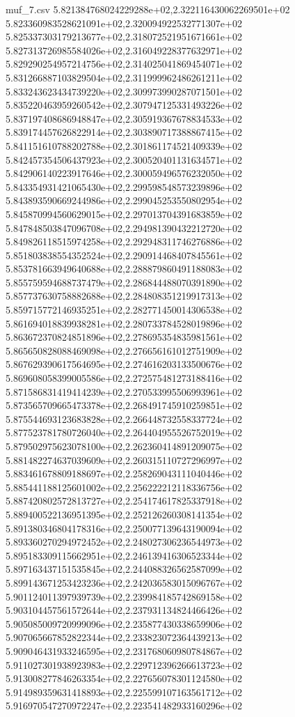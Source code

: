 \begin{filecontents*}{muf_7.csv}
5.821384768024229288e+02,2.322116430062269501e+02
5.823360983528621091e+02,2.320094922532771307e+02
5.825337303179213677e+02,2.318072521951671661e+02
5.827313726985584026e+02,2.316049228377632971e+02
5.829290254957214756e+02,2.314025041869454071e+02
5.831266887103829504e+02,2.311999962486261211e+02
5.833243623434739220e+02,2.309973990287071501e+02
5.835220463959260542e+02,2.307947125331493226e+02
5.837197408686948847e+02,2.305919367678834533e+02
5.839174457626822914e+02,2.303890717388867415e+02
5.841151610788202788e+02,2.301861174521409339e+02
5.842457354506437923e+02,2.300520401131634571e+02
5.842906140223917646e+02,2.300059496576232050e+02
5.843354931421065430e+02,2.299598548573239896e+02
5.843893590669244986e+02,2.299045253550802954e+02
5.845870994560629015e+02,2.297013704391683859e+02
5.847848503847096708e+02,2.294981390432212720e+02
5.849826118515974258e+02,2.292948311746276886e+02
5.851803838554352524e+02,2.290914468407845561e+02
5.853781663949640688e+02,2.288879860491188083e+02
5.855759594688737479e+02,2.286844488070391890e+02
5.857737630758882688e+02,2.284808351219917313e+02
5.859715772146935251e+02,2.282771450014306538e+02
5.861694018839938281e+02,2.280733784528019896e+02
5.863672370824851896e+02,2.278695354835981561e+02
5.865650828088469098e+02,2.276656161012751909e+02
5.867629390617564695e+02,2.274616203133500676e+02
5.869608058399005586e+02,2.272575481273188416e+02
5.871586831419414239e+02,2.270533995506993961e+02
5.873565709665473378e+02,2.268491745910259851e+02
5.875544693123683828e+02,2.266448732558337724e+02
5.877523781780726040e+02,2.264404955526752019e+02
5.879502975623078100e+02,2.262360414891209075e+02
5.881482274637039609e+02,2.260315110727296997e+02
5.883461678809188697e+02,2.258269043111040446e+02
5.885441188125601002e+02,2.256222212118336756e+02
5.887420802572813727e+02,2.254174617825337918e+02
5.889400522136951395e+02,2.252126260308141354e+02
5.891380346804178316e+02,2.250077139643190094e+02
5.893360270294972452e+02,2.248027306236544973e+02
5.895183309115662951e+02,2.246139416306523344e+02
5.897163437151535845e+02,2.244088326562587099e+02
5.899143671253423236e+02,2.242036583015096767e+02
5.901124011397939739e+02,2.239984185742869158e+02
5.903104457561572644e+02,2.237931134824466426e+02
5.905085009720999096e+02,2.235877430338659906e+02
5.907065667852822344e+02,2.233823072364439213e+02
5.909046431933246595e+02,2.231768060980784867e+02
5.911027301938923983e+02,2.229712396266613723e+02
5.913008277846263354e+02,2.227656078301124580e+02
5.914989359631418893e+02,2.225599107163561712e+02
5.916970547270972247e+02,2.223541482933160296e+02

\end{filecontents*}
